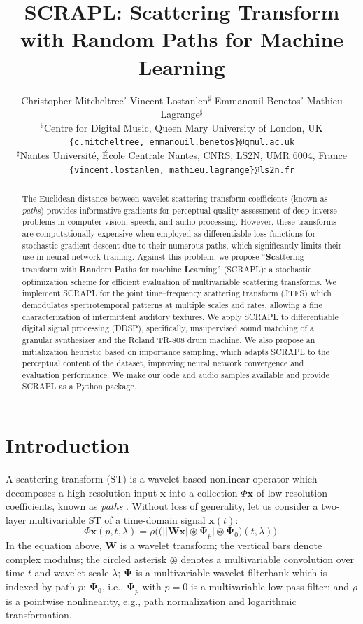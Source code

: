 \documentclass{article} %
\title{SCRAPL: Scattering Transform with Random Paths for Machine Learning\vspace{-8pt}}
\author{
  Christopher Mitcheltree$^\flat$ \hspace{3.5pt} Vincent Lostanlen$^\sharp$ \hspace{3.5pt} Emmanouil Benetos$^\flat$ \hspace{3.5pt} Mathieu Lagrange$^\sharp$
  \vspace{8pt}\\
  $^\flat$Centre for Digital Music, Queen Mary University of London, UK
  \vspace{1pt}\\
  \texttt{\{c.mitcheltree, emmanouil.benetos\}@qmul.ac.uk}
  \vspace{6pt}\\
  $^\sharp$Nantes Université, École Centrale Nantes, CNRS, LS2N, UMR 6004, France
  \vspace{1pt}\\
  \texttt{\{vincent.lostanlen, mathieu.lagrange\}@ls2n.fr}
  \vspace{-12pt}
}
\theoremstyle{plain}
\theoremstyle{definition}
\theoremstyle{remark}
\begin{document}
\maketitle

\begin{abstract}
\vspace{-4pt}
The Euclidean distance between wavelet scattering transform coefficients (known as \emph{paths}) provides informative gradients for perceptual quality assessment of deep inverse problems in computer vision, speech, and audio processing.  
However, these transforms are computationally expensive when employed as differentiable loss functions for stochastic gradient descent due to their numerous paths, which significantly limits their use in neural network training.
Against this problem, we propose ``\textbf{Sc}attering transform with \textbf{Ra}ndom \textbf{P}aths for machine \textbf{L}earning'' (SCRAPL): a stochastic optimization scheme for efficient evaluation of multivariable scattering transforms.
We implement SCRAPL for the joint time–frequency scattering transform (JTFS) which demodulates spectrotemporal patterns at multiple scales and rates, allowing a fine characterization of intermittent auditory textures.
We apply SCRAPL to differentiable digital signal processing (DDSP), specifically, unsupervised sound matching of a granular synthesizer and the Roland TR-808 drum machine.
We also propose an initialization heuristic based on importance sampling, which adapts SCRAPL to the perceptual content of the dataset, improving neural network convergence and evaluation performance.
We make our code and audio samples available and provide SCRAPL as a Python package.
\end{abstract}


\vspace{-8pt}
\section{Introduction}
\label{sec:intro}
\vspace{-4pt}
A scattering transform (ST) is a wavelet-based nonlinear operator which decomposes a high-resolution input  $\boldsymbol{x}$ into a collection $\Phi\boldsymbol{x}$ of low-resolution coefficients, known as \emph{paths} \citep{mallat2012group}.
Without loss of generality, let us consider a two-layer multivariable ST of a time-domain signal $\boldsymbol{x}(t)$:
\begin{equation}
\Phi\boldsymbol{x}(p, t,\lambda) =
\rho\Big( \Big( \Big\vert \vert \mathbf{W}\boldsymbol{x}\vert \circledast \boldsymbol{\Psi}_{p} \Big\vert \circledast \boldsymbol{\Psi}_0 \Big)(t, \lambda) \Big).
\label{eq:def-Sx}
\end{equation}
In the equation above, $\mathbf{W}$ is a wavelet transform; the vertical bars denote complex modulus; the circled asterisk $\circledast $ denotes a multivariable convolution over time $t$ and wavelet scale $\lambda$; $\boldsymbol{\Psi}$ is a multivariable wavelet  filterbank which is indexed by path $p$; $\boldsymbol{\Psi}_0$, i.e., $\boldsymbol{\Psi}_p$ with $p=0$ is a multivariable low-pass filter; and $\rho$ is a pointwise nonlinearity, e.g., path normalization and logarithmic transformation.
\end{document}

